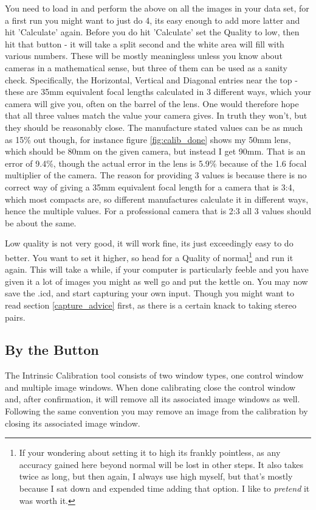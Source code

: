 \documentclass[10pt,a4paper,twoside]{article}
\begin{document}
You need to load in and perform the above on all the images in your data set, for a first run you might want to just do 4, its easy enough to add more latter and hit 'Calculate' again. Before you do hit 'Calculate' set the Quality to low, then hit that button - it will take a split second and the white area will fill with various numbers. These will be mostly meaningless unless you know about cameras in a mathematical sense, but three of them can be used as a sanity check. Specifically, the Horizontal, Vertical and Diagonal entries near the top - these are 35mm equivalent focal lengths calculated in 3 different ways, which your camera will give you, often on the barrel of the lens. One would therefore hope that all three values match the value your camera gives. In truth they won't, but they should be reasonably close. The manufacture stated values can be as much as 15\% out though, for instance figure \ref{fig:calib_done} shows my 50mm lens, which should be 80mm on the given camera, but instead I get 90mm. That is an error of 9.4\%, though the actual error in the lens is 5.9\% because of the 1.6 focal multiplier of the camera. The reason for providing 3 values is because there is no correct way of giving a 35mm equivalent focal length for a camera that is 3:4, which most compacts are, so different manufactures calculate it in different ways, hence the multiple values. For a professional camera that is 2:3 all 3 values should be about the same.

Low quality is not very good, it will work fine, its just exceedingly easy to do better. You want to set it higher, so head for a Quality of normal\footnote{If your wondering about setting it to high its frankly pointless, as any accuracy gained here beyond normal will be lost in other steps. It also takes twice as long, but then again, I always use high myself, but that's mostly because I sat down and expended time adding that option. I like to \emph{pretend} it was worth it.} and run it again. This will take a while, if your computer is particularly feeble and you have given it a lot of images you might as well go and put the kettle on. You may now save the .icd, and start capturing your own input. Though you might want to read section \ref{capture_advice} first, as there is a certain knack to taking stereo pairs.


\subsection{By the Button}
The Intrinsic Calibration tool consists of two window types, one control window and multiple image windows. When done calibrating close the control window and, after confirmation, it will remove all its associated image windows as well. Following the same convention you may remove an image from the calibration by closing its associated image window.
\end{document}
